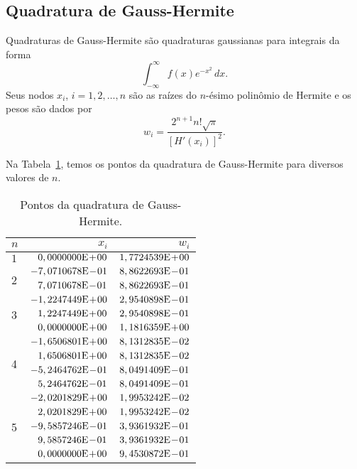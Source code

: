 \subsection{Quadratura de Gauss-Hermite}

Quadraturas de Gauss-Hermite são quadraturas gaussianas para integrais da forma
\begin{equation}
  \int_{-\infty}^\infty f(x)e^{-x^2}\,dx.
\end{equation}
Seus nodos $x_i$, $i=1, 2, \dotsc, n$ são as raízes do $n$-ésimo polinômio de Hermite e os pesos são dados por
\begin{equation}
  w_i = \frac{2^{n+1}n!\sqrt{\pi}}{[H'(x_i)]^2}.
\end{equation}

Na Tabela~\ref{tab:quad_GH}, temos os pontos da quadratura de Gauss-Hermite para diversos valores de $n$.

\begin{table}[h!]
  \centering
  \caption{Pontos da quadratura de Gauss-Hermite.}
  \begin{tabular}{lrr}
    $n$ & $x_i$ & $w_i$ \\\hline
    $1$ & $0,0000000\mathrm{E}\!+\!00$ & $1,7724539\mathrm{E}\!+\!00$ \\
    \multirow{2}{*}{2}
    & $-7,0710678\mathrm{E}\!-\!01$ & $8,8622693\mathrm{E}\!-\!01$ \\
    & $7,0710678\mathrm{E}\!-\!01$ & $8,8622693\mathrm{E}\!-\!01$ \\\hline
    \multirow{3}{*}{3}
    & $-1,2247449\mathrm{E}\!+\!00$ & $2,9540898\mathrm{E}\!-\!01$ \\
    & $1,2247449\mathrm{E}\!+\!00$ & $2,9540898\mathrm{E}\!-\!01$ \\
    & $0,0000000\mathrm{E}\!+\!00$ & $1,1816359\mathrm{E}\!+\!00$ \\\hline
    \multirow{4}{*}{4}
    & $-1,6506801\mathrm{E}\!+\!00$ & $8,1312835\mathrm{E}\!-\!02$ \\
    & $1,6506801\mathrm{E}\!+\!00$ & $8,1312835\mathrm{E}\!-\!02$ \\
    & $-5,2464762\mathrm{E}\!-\!01$ & $8,0491409\mathrm{E}\!-\!01$ \\
    & $5,2464762\mathrm{E}\!-\!01$ & $8,0491409\mathrm{E}\!-\!01$ \\\hline
    \multirow{5}{*}{5}
    & $-2,0201829\mathrm{E}\!+\!00$ & $1,9953242\mathrm{E}\!-\!02$ \\
    & $2,0201829\mathrm{E}\!+\!00$ & $1,9953242\mathrm{E}\!-\!02$ \\
    & $-9,5857246\mathrm{E}\!-\!01$ & $3,9361932\mathrm{E}\!-\!01$ \\
    & $9,5857246\mathrm{E}\!-\!01$ & $3,9361932\mathrm{E}\!-\!01$ \\
    & $0,0000000\mathrm{E}\!+\!00$ & $9,4530872\mathrm{E}\!-\!01$ \\\hline
  \end{tabular}
  \label{tab:quad_GH}
\end{table}

